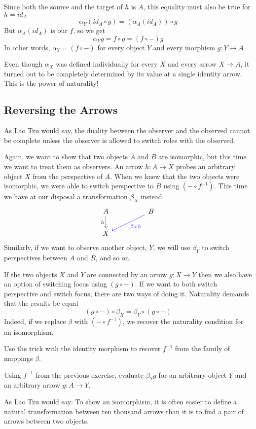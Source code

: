 \documentclass[DaoFP]{subfiles}
\begin{document}
Since both the source and the target of $h$ is $A$, this equality must also be true for $h = id_A$
\[\alpha_Y (id_A \circ g) = (\alpha_A (id_A)) \circ g \]
But $\alpha_A(id_A)$ is our $f$, so we get
\[\alpha_Y g = f \circ g = (f \circ -) g\]
In other words, $\alpha_Y = (f \circ -)$ for every object $Y$ and every morphism $g \colon Y \to A$

Even though $\alpha_X$ was defined individually for every $X$ and every arrow $X \to A$, it turned out to be completely determined by its value at a single identity arrow. This is the power of naturality!
\subsection{Reversing the Arrows}
As Lao Tzu would say, the duality between the observer and the observed cannot be complete unless the observer is allowed to switch roles with the observed. 

Again, we want to show that two objects $A$ and $B$ are isomorphic, but this time we want to treat them as observers. An arrow $h \colon A \to X$ probes an arbitrary object $X$ from the perspective of $A$. When we knew that the two objects were isomorphic, we were able to switch perspective to $B$ using $(- \circ f^{-1})$. This time we have at our disposal a transformation $\beta_X$ instead.
\[
 \begin{tikzcd}
 A
 \arrow[d, "h"']
 && B
 \arrow[lld, blue, "\beta_X h"]
 \\
 X
  \end{tikzcd}
\]
Similarly, if we want to observe another object, $Y$, we will use $\beta_Y$ to switch perspectives between $A$ and $B$, and so on. 

If the two objects $X$ and $Y$ are connected by an arrow $g \colon X \to Y$ then we also have an option of switching focus using $(g \circ -)$. If we want to both switch perspective and switch focus, there are two ways of doing it. Naturality demands that the results be equal
\[ (g \circ -) \circ \beta_X = \beta_Y \circ (g \circ -) \]
Indeed, if we replace $\beta$ with $(- \circ f^{-1})$, we recover the naturality condition for an isomorphism. 

\begin{exercise}
Use the trick with the identity morphism to recover $f^{-1}$ from the family of mappings $\beta$.
\end{exercise}
\begin{exercise}
Using $f^{-1}$ from the previous exercise, evaluate $\beta_Y g$ for an arbitrary object $Y$ and an arbitrary arrow $g \colon A \to Y$.
\end{exercise}


As Lao Tzu would say: To show an isomorphism, it is often easier to define a natural transformation between ten thousand arrows than it is to find a pair of arrows between two objects.
\end{document}
